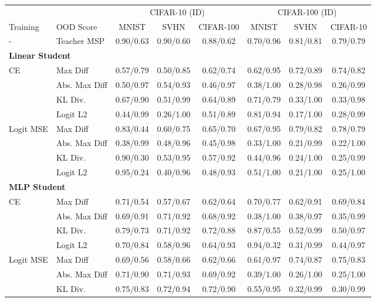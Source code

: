 \documentclass[border=2pt]{standalone}
\begin{document}
\setlength{\tabcolsep}{5pt}
\begin{tabular}{llcccccc}
\toprule
& & \multicolumn{3}{c}{CIFAR-10 (ID)} & \multicolumn{3}{c}{CIFAR-100 (ID)} \\
\cmidrule(lr){3-5} \cmidrule(lr){6-8}
Training & OOD Score & MNIST & SVHN & CIFAR-100 & MNIST & SVHN & CIFAR-10 \\
\midrule
- & Teacher MSP & 0.90/0.63 & 0.90/0.60 & 0.88/0.62 & 0.70/0.96 & 0.81/0.81 & 0.79/0.79 \\
\midrule
\multicolumn{8}{l}{\textbf{Linear Student}} \\
CE & Max Diff & 0.57/0.79 & 0.50/0.85 & 0.62/0.74 & 0.62/0.95 & 0.72/0.89 & 0.74/0.82 \\
 & Abs. Max Diff & 0.50/0.97 & 0.54/0.93 & 0.46/0.97 & 0.38/1.00 & 0.28/0.98 & 0.26/0.99 \\
 & KL Div. & 0.67/0.90 & 0.51/0.99 & 0.64/0.89 & 0.71/0.79 & 0.33/1.00 & 0.33/0.98 \\
 & Logit L2 & 0.44/0.99 & 0.26/1.00 & 0.51/0.89 & 0.81/0.94 & 0.17/1.00 & 0.28/0.99 \\
\addlinespace
Logit MSE & Max Diff & 0.83/0.44 & 0.60/0.75 & 0.65/0.70 & 0.67/0.95 & 0.79/0.82 & 0.78/0.79 \\
 & Abs. Max Diff & 0.38/0.99 & 0.48/0.96 & 0.45/0.98 & 0.33/1.00 & 0.21/0.99 & 0.22/1.00 \\
 & KL Div. & 0.90/0.30 & 0.53/0.95 & 0.57/0.92 & 0.44/0.96 & 0.24/1.00 & 0.25/0.99 \\
 & Logit L2 & 0.95/0.24 & 0.40/0.96 & 0.48/0.93 & 0.51/1.00 & 0.21/1.00 & 0.25/1.00 \\
\midrule
\multicolumn{8}{l}{\textbf{MLP Student}} \\
CE & Max Diff & 0.71/0.54 & 0.57/0.67 & 0.62/0.64 & 0.70/0.77 & 0.62/0.91 & 0.69/0.84 \\
 & Abs. Max Diff & 0.69/0.91 & 0.71/0.92 & 0.68/0.92 & 0.38/1.00 & 0.38/0.97 & 0.35/0.99 \\
 & KL Div. & 0.79/0.73 & 0.71/0.92 & 0.72/0.88 & 0.87/0.55 & 0.52/0.99 & 0.50/0.97 \\
 & Logit L2 & 0.70/0.84 & 0.58/0.96 & 0.64/0.93 & 0.94/0.32 & 0.31/0.99 & 0.44/0.97 \\
\addlinespace
Logit MSE & Max Diff & 0.69/0.56 & 0.58/0.66 & 0.62/0.66 & 0.61/0.97 & 0.74/0.87 & 0.75/0.83 \\
 & Abs. Max Diff & 0.71/0.90 & 0.71/0.93 & 0.69/0.92 & 0.39/1.00 & 0.26/1.00 & 0.25/1.00 \\
 & KL Div. & 0.75/0.83 & 0.72/0.94 & 0.72/0.90 & 0.55/0.95 & 0.32/0.99 & 0.30/0.99 \\

\end{tabular}
\end{document}
